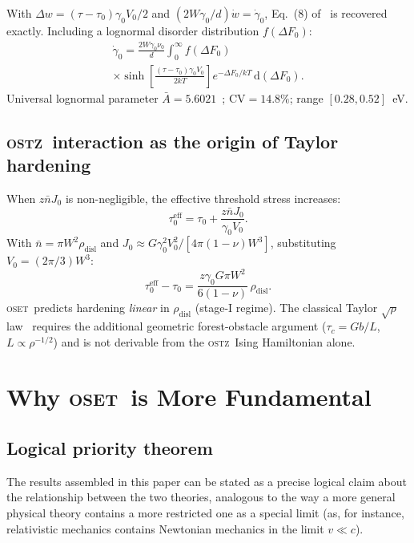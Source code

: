 \documentclass[5p,sort&compress]{elsarticle}
\newcommand{\OSTZ}{\textsc{ostz}}
\newcommand{\OSET}{\textsc{oset}}
\newcommand{\dF}{\Delta F_0}
\newcommand{\gz}{\gamma_0}
\begin{document}
With $\Delta w=(\tau-\tau_0)\gz V_0/2$ and $(2W\gz/d)\dot w=\dot\gz$,
Eq.~(8) of~\cite{pad-part1} is recovered exactly.
Including a lognormal disorder distribution $f(\dF)$:
\begin{multline}
  \dot\gz=\frac{2W\gz\nu_0}{d}\int_0^\infty f(\dF)\\
  \times\sinh\!\left[\frac{(\tau-\tau_0)\gz V_0}{2kT}\right]
  e^{-\dF/kT}\,\mathrm d(\dF).
  \label{eq:rateDisorder}
\end{multline}
Universal lognormal parameter $\bar A=5.6021$~\cite{venkatesh-part4};
CV$=14.8\%$; range $[0.28,0.52]$~eV.

\subsection{\OSTZ\ interaction as the origin of Taylor hardening}
\label{sec:taylor}

When $z\bar nJ_0$ is non-negligible, the effective threshold
stress increases:
\begin{equation}
  \tau_0^\text{eff}=\tau_0+\frac{z\bar nJ_0}{\gz V_0}.
  \label{eq:tau0eff}
\end{equation}
With $\bar n=\pi W^2\rho_\text{disl}$ and
$J_0\approx G\gz^2V_0^2/[4\pi(1-\nu)W^3]$,
substituting $V_0=(2\pi/3)W^3$:
\begin{equation}
  \tau_0^\text{eff}-\tau_0=
  \frac{z\gz G\pi W^2}{6(1-\nu)}\,\rho_\text{disl}.
  \label{eq:Taylorhardening}
\end{equation}
\OSET\ predicts hardening \emph{linear} in $\rho_\text{disl}$
(stage-I regime). The classical Taylor $\sqrt\rho$ law~\cite{taylor1934} requires
the additional geometric forest-obstacle argument
($\tau_c=Gb/L$, $L\propto\rho^{-1/2}$) and is not derivable
from the \OSTZ\ Ising Hamiltonian alone.

\section{Why \OSET\ is More Fundamental}
\label{sec:fundamental}

\subsection{Logical priority theorem}

The results assembled in this paper can be stated as a precise
logical claim about the relationship between the two theories,
analogous to the way a more general physical theory contains a more
restricted one as a special limit (as, for instance, relativistic
mechanics contains Newtonian mechanics in the limit $v\ll c$).
\end{document}
